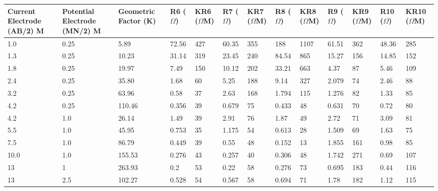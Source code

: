 \documentclass[12pt,a4paper]{report}
\begin{document}
\begin{itemize}
    \begin{table}[h!]
        \centering
        \begin{adjustbox}{max width=\textwidth}
        \renewcommand{\arraystretch}{1.5}
        \begin{tabular}{|p{2.5cm}|p{2.5cm}|p{2.5cm}|p{1.5cm}|p{1.8cm}|p{1.5cm}|p{1.8cm}|p{1.5cm}|p{1.8cm}|p{1.5cm}|p{1.8cm}|p{1.5cm}|p{1.8cm}|}
        \hline
        \textbf{Current Electrode (AB/2) M} & 
        \textbf{Potential Electrode (MN/2) M} & 
        \textbf{Geometric Factor (K)} & 
        \textbf{R6 ($\Omega$)} & 
        \textbf{KR6 ($\Omega$M)} & 
        \textbf{R7 ($\Omega$)} & 
        \textbf{KR7 ($\Omega$M)} & 
        \textbf{R8 ($\Omega$)} & 
        \textbf{KR8 ($\Omega$M)} & 
        \textbf{R9 ($\Omega$)} & 
        \textbf{KR9 ($\Omega$M)} & 
        \textbf{R10 ($\Omega$)} & 
        \textbf{KR10 ($\Omega$M)} \\ 
        \hline
        1.0 & 0.25 & 5.89 & 72.56 & 427 & 60.35 & 355 & 188 & 1107 & 61.51 & 362 & 48.36 & 285 \\ \hline
        1.3 & 0.25 & 10.23 & 31.14 & 319 & 23.45 & 240 & 84.54 & 865 & 15.27 & 156 & 14.85 & 152 \\ \hline
        1.8 & 0.25 & 19.97 & 7.49 & 150 & 10.12 & 202 & 33.21 & 663 & 4.37 & 87 & 5.46 & 109 \\ \hline
        2.4 & 0.25 & 35.80 & 1.68 & 60 & 5.25 & 188 & 9.14 & 327 & 2.079 & 74 & 2.46 & 88 \\ \hline
        3.2 & 0.25 & 63.96 & 0.58 & 37 & 2.63 & 168 & 1.794 & 115 & 1.276 & 82 & 1.33 & 85 \\ \hline
        4.2 & 0.25 & 110.46 & 0.356 & 39 & 0.679 & 75 & 0.433 & 48 & 0.631 & 70 & 0.72 & 80 \\ \hline
        4.2 & 1.0 & 26.14 & 1.49 & 39 & 2.91 & 76 & 1.87 & 49 & 2.72 & 71 & 3.09 & 81 \\ \hline
        5.5 & 1.0 & 45.95 & 0.753 & 35 & 1.175 & 54 & 0.613 & 28 & 1.509 & 69 & 1.63 & 75 \\ \hline
        7.5 & 1.0 & 86.79 & 0.449 & 39 & 0.55 & 48 & 0.152 & 13 & 1.855 & 161 & 0.98 & 85 \\ \hline
        10.0 & 1.0 & 155.53 & 0.276 & 43 & 0.257 & 40 & 0.306 & 48 & 1.742 & 271 & 0.69 & 107 \\ \hline
        13 & 1 & 263.93 & 0.2 & 53 & 0.22 & 58 & 0.276 & 73 & 0.695 & 183 & 0.44 & 116 \\ \hline
        13 & 2.5 & 102.27 & 0.528 & 54 & 0.567 & 58 & 0.694 & 71 & 1.78 & 182 & 1.12 & 115 \\ \hline

\end{tabular}
\end{adjustbox}
\end{table}
\end{itemize}
\end{document}
